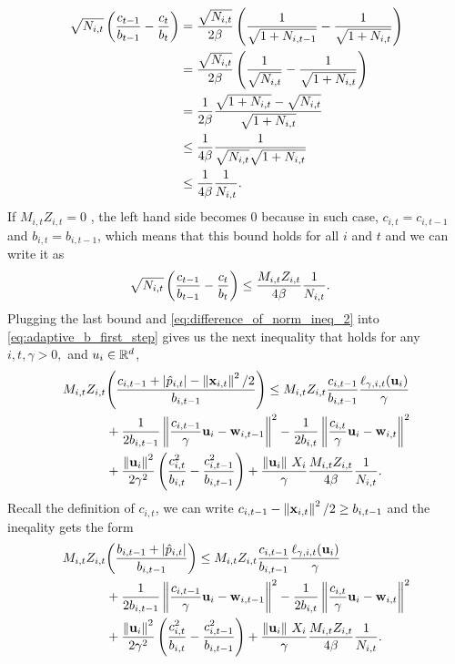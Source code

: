 \begin{equation*}
\begin{split}
\sqrt{N_{i,t}}\left({\frac{c_{t-1}}{b_{t-1}}-\frac{c_t}{b_t}}\right)&=\frac{\sqrt{N_{i,t}}}{2\beta}\left({\frac{1}{\sqrt{1+N_{i,t-1}}}-\frac{1}{\sqrt{1+N_{i,t}}}}\right)\\
&=\frac{\sqrt{N_{i,t}}}{2\beta}\left({\frac{1}{\sqrt{N_{i,t}}}-\frac{1}{\sqrt{1+N_{i,t}}}}\right)\\
&=\frac{1}{2\beta}\frac{\sqrt{1+N_{i,t}}-\sqrt{N_{i,t}}}{\sqrt{1+N_{i,t}}}\\
&\le\frac{1}{4\beta}\frac{1}{\sqrt{N_{i,t}}\sqrt{1+N_{i,t}}}\\
&\le\frac{1}{4\beta}\frac{1}{N_{i,t}}.
\end{split}
\end{equation*} 
If $M_{i,t}Z_{i,t}=0$ , the left hand side becomes $0$ because in such case, $c_{i,t}=c_{i,t-1}$ and $b_{i,t}=b_{i,t-1}$, which means that this bound holds for all $i$ and $t$ and we can write it as  
\begin{equation*}
\begin{split}
\sqrt{N_{i,t}}\left({\frac{c_{t-1}}{b_{t-1}}-\frac{c_t}{b_t}}\right)
&\le\frac{M_{i,t}Z_{i,t}}{4\beta}\frac{1}{N_{i,t}}.
\end{split}
\end{equation*}
Plugging the  last bound and \eqref{eq:difference_of_norm_ineq_2} into \eqref{eq:adaptive_b_first_step} gives us the next inequality that holds for any $i,t,\gamma>0,$ and $u_i\in\mathbb{R}^d$,
\begin{equation*}
\begin{split}
M_{i,t}Z_{i,t}&{\left({\frac{c_{i,t-1} +\left\vert{\hat{p}_{i,t}}\right\vert-\left\Vert {\mathbf{x}_{i,t}} \right\Vert^2/2}{b_{i,t-1}}}\right)} \le M_{i,t}Z_{i,t}\frac{c_{i,t-1}}{b_{i,t-1}}\frac{\ell_{\gamma,i,t}(\mathbf{u}_i)}{\gamma}\\
&+\frac{1}{2b_{i,t-1}}\left\Vert {\frac{c_{i,t-1}}{\gamma} \mathbf{u}_i-\mathbf{w}_{i,t-1}} \right\Vert^2-\frac{1}{2b_{i,t}}\left\Vert {\frac{c_{i,t}}{\gamma} \mathbf{u}_i-\mathbf{w}_{i,t}} \right\Vert^2\\
&+\frac{\left\Vert {\mathbf{u}_i} \right\Vert^2}{2\gamma^2}\left({\frac{c_{i,t}^2}{b_{i,t}}-\frac{c_{i,t-1}^2}{b_{i,t-1}}}\right)+
\frac{\Vert\mathbf{u}_i\Vert~ X_i}{\gamma}\frac{M_{i,t}Z_{i,t}}{4\beta}\frac{1}{N_{i,t}}.
\end{split}
\end{equation*}
Recall the definition of $c_{i,t}$, we can write $c_{i,t-1}-\left\Vert {\mathbf{x}_{i,t}} \right\Vert^2/2\ge b_{i,t-1}$ and the ineqality gets the form
\begin{equation*}
\begin{split}
M_{i,t}Z_{i,t}&{\left({\frac{b_{i,t-1} +\left\vert{\hat{p}_{i,t}}\right\vert}{b_{i,t-1}}}\right)} \le M_{i,t}Z_{i,t}\frac{c_{i,t-1}}{b_{i,t-1}}\frac{\ell_{\gamma,i,t}(\mathbf{u}_i)}{\gamma}\\
&+\frac{1}{2b_{i,t-1}}\left\Vert {\frac{c_{i,t-1}}{\gamma} \mathbf{u}_i-\mathbf{w}_{i,t-1}} \right\Vert^2-\frac{1}{2b_{i,t}}\left\Vert {\frac{c_{i,t}}{\gamma} \mathbf{u}_i-\mathbf{w}_{i,t}} \right\Vert^2\\
&+\frac{\left\Vert {\mathbf{u}_i} \right\Vert^2}{2\gamma^2}\left({\frac{c_{i,t}^2}{b_{i,t}}-\frac{c_{i,t-1}^2}{b_{i,t-1}}}\right)+
\frac{\Vert\mathbf{u}_i\Vert~ X_i}{\gamma}\frac{M_{i,t}Z_{i,t}}{4\beta}\frac{1}{N_{i,t}}.
\end{split}
\end{equation*}
